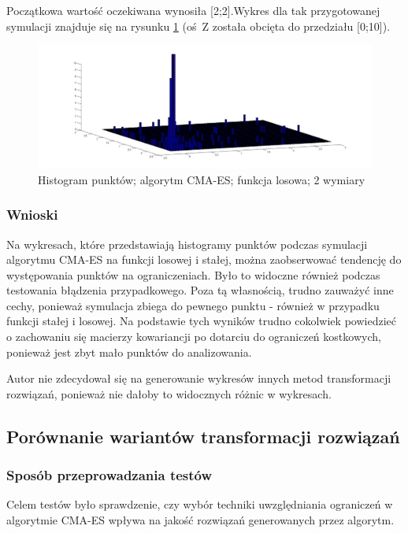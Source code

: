 \documentclass{mini}
\begin{document}
Początkowa wartość oczekiwana wynosiła [2;2].Wykres dla tak przygotowanej symulacji znajduje się na rysunku \ref{cmaes:x2} (oś~Z została obcięta do przedziału [0;10]).

\begin{figure}[H]
\centering
\includegraphics[width=\textwidth]{cmaes-x2dim2-boundaries-v2}
\caption{Histogram punktów; algorytm CMA-ES; funkcja losowa; 2 wymiary}
\label{cmaes:x2}
\end{figure}

\subsubsection{Wnioski}
\hspace{3,4ex}Na wykresach, które przedstawiają histogramy punktów podczas symulacji algorytmu CMA-ES na funkcji losowej i stałej, można zaobserwować tendencję do występowania punktów na ograniczeniach. Było to widoczne również podczas testowania błądzenia przypadkowego. Poza tą własnością, trudno zauważyć inne cechy, ponieważ symulacja zbiega do pewnego punktu - również w przypadku funkcji stałej i losowej. Na podstawie tych wyników trudno cokolwiek powiedzieć o zachowaniu się macierzy kowariancji po dotarciu do ograniczeń kostkowych, ponieważ jest zbyt mało punktów do analizowania.

Autor nie zdecydował się na generowanie wykresów innych metod transformacji rozwiązań, ponieważ nie dałoby to widocznych różnic w wykresach.

\subsection{Porównanie wariantów transformacji rozwiązań}

\subsubsection{Sposób przeprowadzania testów}
\hspace{3,4ex}Celem testów było sprawdzenie, czy wybór techniki uwzględniania ograniczeń w algorytmie CMA-ES wpływa na jakość rozwiązań generowanych przez algorytm.
\end{document}
